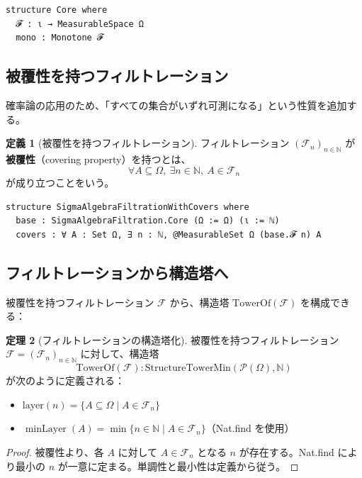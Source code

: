 \documentclass[12pt,a4paper]{article}
\theoremstyle{definition}
\newtheorem{definition}{定義}[section]
\newtheorem{theorem}[definition]{定理}
\newcommand{\N}{\mathbb{N}}
\newcommand{\cF}{\mathcal{F}}
\DeclareMathOperator{\minLayer}{minLayer}
\begin{document}
\begin{lstlisting}[language=Lean]
structure Core where
  𝓕 : ι → MeasurableSpace Ω
  mono : Monotone 𝓕
\end{lstlisting}

\subsection{被覆性を持つフィルトレーション}

確率論の応用のため、「すべての集合がいずれ可測になる」という性質を追加する。

\begin{definition}[被覆性を持つフィルトレーション]
フィルトレーション $(\cF_n)_{n \in \N}$ が\textbf{被覆性}（covering property）を持つとは、
\[
\forall A \subseteq \Omega,\ \exists n \in \N,\ A \in \cF_n
\]
が成り立つことをいう。
\end{definition}

\begin{lstlisting}[language=Lean]
structure SigmaAlgebraFiltrationWithCovers where
  base : SigmaAlgebraFiltration.Core (Ω := Ω) (ι := ℕ)
  covers : ∀ A : Set Ω, ∃ n : ℕ, @MeasurableSet Ω (base.𝓕 n) A
\end{lstlisting}

\subsection{フィルトレーションから構造塔へ}

被覆性を持つフィルトレーション $\cF$ から、構造塔 $\text{TowerOf}(\cF)$ を構成できる：

\begin{theorem}[フィルトレーションの構造塔化]
被覆性を持つフィルトレーション $\cF = (\cF_n)_{n \in \N}$ に対して、構造塔
\[
\text{TowerOf}(\cF) : \text{StructureTowerMin}(\mathcal{P}(\Omega), \N)
\]
が次のように定義される：
\begin{itemize}
\item $\text{layer}(n) = \{A \subseteq \Omega \mid A \in \cF_n\}$
\item $\minLayer(A) = \min\{n \in \N \mid A \in \cF_n\}$（Nat.find を使用）
\end{itemize}
\end{theorem}

\begin{proof}
被覆性より、各 $A$ に対して $A \in \cF_n$ となる $n$ が存在する。Nat.find により最小の $n$ が一意に定まる。単調性と最小性は定義から従う。
\end{proof}
\end{document}
